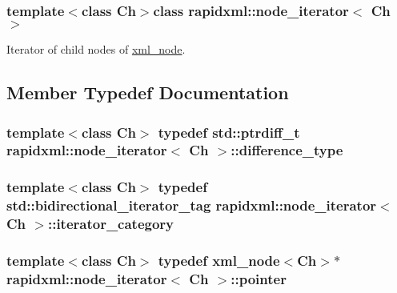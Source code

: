 \subsubsection*{template$<$class Ch$>$class rapidxml\+::node\+\_\+iterator$<$ Ch $>$}

Iterator of child nodes of \hyperlink{classrapidxml_1_1xml__node}{xml\+\_\+node}. 

\subsection{Member Typedef Documentation}
\hypertarget{classrapidxml_1_1node__iterator_a5bdc462b980a52c5fa2d99ac9f4f4bff}{}
\subsubsection[{difference\+\_\+type}]{\setlength{\rightskip}{0pt plus 5cm}template$<$class Ch$>$ typedef std\+::ptrdiff\+\_\+t {\bf rapidxml\+::node\+\_\+iterator}$<$ Ch $>$\+::{\bf difference\+\_\+type}}\label{classrapidxml_1_1node__iterator_a5bdc462b980a52c5fa2d99ac9f4f4bff}
\hypertarget{classrapidxml_1_1node__iterator_a8e82d75f768e17bf7349d010ee26c037}{}
\subsubsection[{iterator\+\_\+category}]{\setlength{\rightskip}{0pt plus 5cm}template$<$class Ch$>$ typedef std\+::bidirectional\+\_\+iterator\+\_\+tag {\bf rapidxml\+::node\+\_\+iterator}$<$ Ch $>$\+::{\bf iterator\+\_\+category}}\label{classrapidxml_1_1node__iterator_a8e82d75f768e17bf7349d010ee26c037}
\hypertarget{classrapidxml_1_1node__iterator_a65dca8bca2b9c29f635b9ad0bdeeecb9}{}
\subsubsection[{pointer}]{\setlength{\rightskip}{0pt plus 5cm}template$<$class Ch$>$ typedef {\bf xml\+\_\+node}$<$Ch$>$$\ast$ {\bf rapidxml\+::node\+\_\+iterator}$<$ Ch $>$\+::{\bf pointer}}\label{classrapidxml_1_1node__iterator_a65dca8bca2b9c29f635b9ad0bdeeecb9}
\hypertarget{classrapidxml_1_1node__iterator_ad7fabbcb7d3d9e4e220299c5475b9e9c}{}
